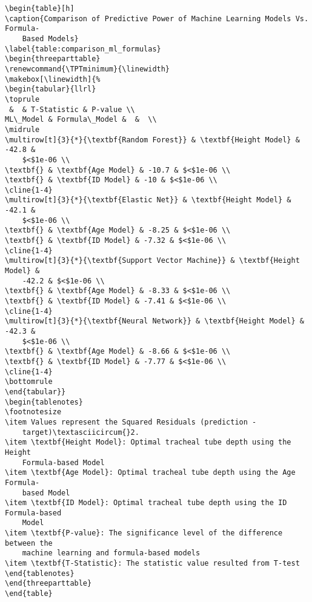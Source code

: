 \documentclass[11pt]{article}
\begin{document}
\begin{Verbatim}[tabsize=4]
\begin{table}[h]
\caption{Comparison of Predictive Power of Machine Learning Models Vs. Formula-
	Based Models}
\label{table:comparison_ml_formulas}
\begin{threeparttable}
\renewcommand{\TPTminimum}{\linewidth}
\makebox[\linewidth]{%
\begin{tabular}{llrl}
\toprule
 &  & T-Statistic & P-value \\
ML\_Model & Formula\_Model &  &  \\
\midrule
\multirow[t]{3}{*}{\textbf{Random Forest}} & \textbf{Height Model} & -42.8 &
	$<$1e-06 \\
\textbf{} & \textbf{Age Model} & -10.7 & $<$1e-06 \\
\textbf{} & \textbf{ID Model} & -10 & $<$1e-06 \\
\cline{1-4}
\multirow[t]{3}{*}{\textbf{Elastic Net}} & \textbf{Height Model} & -42.1 &
	$<$1e-06 \\
\textbf{} & \textbf{Age Model} & -8.25 & $<$1e-06 \\
\textbf{} & \textbf{ID Model} & -7.32 & $<$1e-06 \\
\cline{1-4}
\multirow[t]{3}{*}{\textbf{Support Vector Machine}} & \textbf{Height Model} &
	-42.2 & $<$1e-06 \\
\textbf{} & \textbf{Age Model} & -8.33 & $<$1e-06 \\
\textbf{} & \textbf{ID Model} & -7.41 & $<$1e-06 \\
\cline{1-4}
\multirow[t]{3}{*}{\textbf{Neural Network}} & \textbf{Height Model} & -42.3 &
	$<$1e-06 \\
\textbf{} & \textbf{Age Model} & -8.66 & $<$1e-06 \\
\textbf{} & \textbf{ID Model} & -7.77 & $<$1e-06 \\
\cline{1-4}
\bottomrule
\end{tabular}}
\begin{tablenotes}
\footnotesize
\item Values represent the Squared Residuals (prediction -
	target)\textasciicircum{}2.
\item \textbf{Height Model}: Optimal tracheal tube depth using the Height
	Formula-based Model
\item \textbf{Age Model}: Optimal tracheal tube depth using the Age Formula-
	based Model
\item \textbf{ID Model}: Optimal tracheal tube depth using the ID Formula-based
	Model
\item \textbf{P-value}: The significance level of the difference between the
	machine learning and formula-based models
\item \textbf{T-Statistic}: The statistic value resulted from T-test
\end{tablenotes}
\end{threeparttable}
\end{table}

\end{Verbatim}




\end{document}
